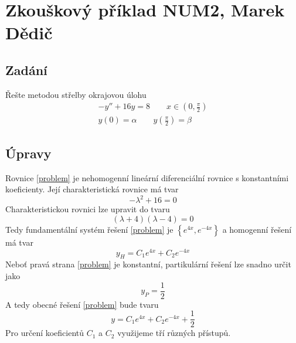 \documentclass[a4paper]{article}
\begin{document}
\section*{Zkouškový příklad NUM2, Marek Dědič}

\subsection*{Zadání}
Řešte metodou střelby okrajovou úlohu
\begin{subequations}\label{input}
	\begin{align}
		-y'' + 16y = 8 \qquad x \in \left( 0, \frac{\pi}{2} \right) \label{problem} \\
		y \left( 0 \right) = \alpha \qquad y \left( \frac{\pi}{2} \right) = \beta \label{boundary}
	\end{align}
\end{subequations}

\subsection*{Úpravy}
Rovnice \eqref{problem} je nehomogenní lineární diferenciální rovnice s konstantními koeficienty. Její charakteristická rovnice má tvar
\begin{equation}\label{chareq1}
	- \lambda^2 + 16 = 0
\end{equation}
Charakteristickou rovnici lze upravit do tvaru
\begin{equation}\label{chareq2}
	\left( \lambda + 4 \right) \left( \lambda - 4 \right) = 0
\end{equation}
Tedy fundamentální systém řešení \eqref{problem} je \( \left\{ e^{ 4x }, e^{ -4x } \right\} \) a homogenní řešení má tvar
\begin{equation}\label{homogeneous}
	y_H = C_1 e^{ 4x } + C_2 e^{ -4x }
\end{equation}
Neboť pravá strana \eqref{problem} je konstantní, partikulární řešení lze snadno určit jako
\begin{equation}\label{particular}
	y_P = \frac{1}{2}
\end{equation}
A tedy obecné řešení \eqref{problem} bude tvaru
\begin{equation}\label{solution}
	y = C_1 e^{ 4x } + C_2 e^{ -4x } + \frac{1}{2}
\end{equation}
Pro určení koeficientů \( C_1 \) a \( C_2 \) využijeme tří různých přístupů.
\end{document}
